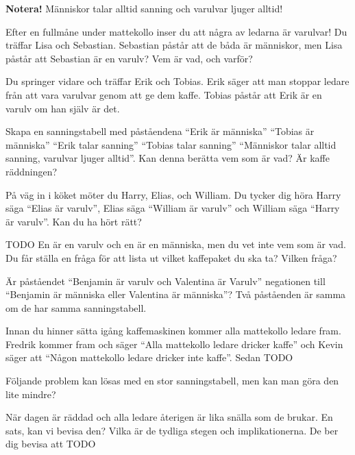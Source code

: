 \noindent
\textbf{Notera!}  Människor talar alltid sanning och varulvar ljuger alltid!

\begin{problem}
	Efter en fullmåne under mattekollo inser du att några av ledarna är varulvar! Du träffar Lisa och Sebastian. Sebastian påstår att de båda är människor, men Lisa påstår att Sebastian är en varulv? Vem är vad, och varför?
\end{problem}

\begin{problem}
	Du springer vidare och träffar Erik och Tobias. Erik säger att man stoppar ledare från att vara varulvar genom att ge dem kaffe. Tobias påstår att Erik är en varulv om han själv är det.

	Skapa en sanningstabell med påståendena ``Erik är människa'' ``Tobias är människa'' ``Erik talar sanning'' ``Tobias talar sanning'' ``Människor talar alltid sanning, varulvar ljuger alltid''. Kan denna berätta vem som är vad? Är kaffe räddningen?
\end{problem}

\begin{problem}
	På väg in i köket möter du Harry, Elias, och William. Du tycker dig höra Harry säga ``Elias är varulv'', Elias säga ``William är varulv'' och William säga ``Harry är varulv''. Kan du ha hört rätt?
\end{problem}

\begin{problem}[Extra]
	TODO
	En är en varulv och en är en människa, men du vet inte vem som är vad. Du får ställa en fråga för att lista ut vilket kaffepaket du ska ta? Vilken fråga?
\end{problem}

\begin{problem}
	Är påståendet ``Benjamin är varulv och Valentina är Varulv'' negationen till ``Benjamin är människa eller Valentina är människa''? Två påståenden är samma om de har samma sanningstabell.
\end{problem}

\begin{problem}
	Innan du hinner sätta igång kaffemaskinen kommer alla mattekollo ledare fram. Fredrik kommer fram och säger ``Alla mattekollo ledare dricker kaffe'' och Kevin säger att ``Någon mattekollo ledare dricker inte kaffe''. Sedan TODO

	Följande problem kan lösas med en stor sanningstabell, men kan man göra den lite mindre?
\end{problem}

\begin{problem}[Extra]
	När dagen är räddad och alla ledare återigen är lika snälla som de brukar. 
	En sats, kan vi bevisa den? Vilka är de tydliga stegen och implikationerna.
	De ber dig bevisa att TODO
\end{problem}

